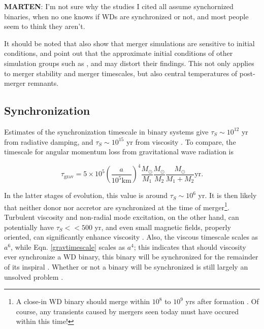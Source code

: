 \textbf{MARTEN}: I'm not sure why the studies I cited all assume synchornized binaries, when no one knows if WDs are synchronized or not, and most people seem to think they aren't.

It should be noted that \cite{dan+11} also show that merger simulations are sensitive to initial conditions, and point out that the approximate initial conditions of other simulation groups such as \citeauthor{loreig09}, \citeauthor{guerig04} and \cite{pakm+10} may distort their findings.  This not only applies to merger stability and merger timescales, but also central temperatures of post-merger remnants.

\subsection{Synchronization}
\label{ssec:synchronization}

Estimates of the synchronization timescale in binary systems give $\tau_{S} \sim 10^{12}$ yr from radiative damping, and $\tau_{S} \sim 10^{15}$ yr from viscosity \citep{marsns04}.  To compare, the timescale for angular momentum loss from gravitational wave radiation is \citep{segrcm97}

\begin{equation}
\tau_{\mathrm{grav}} = 5 \times 10^5 \left( \frac{a}{10^5 \mathrm{km}}\right)^4 \frac{M_{\odot}}{M_1} \frac{M_{\odot}}{M_2} \frac{M_{\odot}}{M_1 + M_2} \mathrm{ yr}.
\label{gravtimescale}
\end{equation}

\noindent In the latter stages of evolution, this value is around $\tau_{S} \sim 10^{6}$ yr.  It is then likely that neither donor nor accretor are synchronized at the time of merger\footnote{A close-in WD binary should merge within $10^8$ to $10^9$ yrs after formation \citep{segrcm97}.  Of course, any transients caused by mergers seen today must have occured within this time!}.  Turbulent viscosity and non-radial mode excitation, on the other hand, can potentially have $\tau_{S} << 500$ yr, and even small magnetic fields, properly oriented, can significantly enhance viscosity \citep{marsns04,ibentf98}.  Also, the viscous timescale scales as $a^6$, while Eqn. \ref{gravtimescale} scales as $a^4$; this indicates that should viscosity ever synchronize a WD binary, this binary will be synchronized for the remainder of its inspiral \citep{ibentf98}.  Whether or not a binary will be synchronized is still largely an unsolved problem \citep{mars11}.

